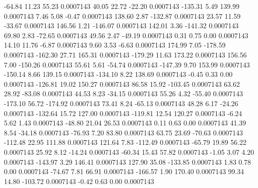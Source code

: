       -64.84       11.23       55.23     0.0007143
       40.05       22.72      -22.20     0.0007143
     -135.31        5.49      139.99     0.0007143
        7.46        5.08       -0.47     0.0007143
      138.60        2.87     -132.87     0.0007143
       23.57       11.59      -33.67     0.0007143
      146.56        1.21     -146.07     0.0007143
      142.01        3.36     -141.32     0.0007143
       69.80        2.83      -72.65     0.0007143
       49.56        2.47      -49.19     0.0007143
        0.31        0.75        0.00     0.0007143
       14.10       11.76       -6.87     0.0007143
        9.60        3.53       -6.63     0.0007143
      174.99        7.05     -178.59     0.0007143
     -162.30       27.71      165.31     0.0007143
     -179.29       11.63      173.22     0.0007143
      156.56        7.00     -150.26     0.0007143
       55.61        5.61      -54.74     0.0007143
     -147.39        9.70      153.99     0.0007143
     -150.14        8.66      139.15     0.0007143
     -134.10        8.22      138.69     0.0007143
       -0.45        0.33        0.00     0.0007143
     -126.81       19.02      150.27     0.0007143
       86.58       15.92     -103.45     0.0007143
       63.62       28.92      -83.08     0.0007143
       44.53        8.23      -34.15     0.0007143
       55.26        4.32      -55.40     0.0007143
     -173.10       56.72     -174.92     0.0007143
       73.41        8.24      -65.13     0.0007143
       48.28        6.17      -24.26     0.0007143
     -132.64       15.72      127.00     0.0007143
     -119.81       12.54      120.27     0.0007143
       -6.24        5.62        1.43     0.0007143
      -48.80       21.04       26.53     0.0007143
        0.11        0.63        0.00     0.0007143
       41.39        8.54      -34.18     0.0007143
      -76.93        7.20       83.80     0.0007143
       63.75       23.69      -70.63     0.0007143
     -112.48       22.95      111.88     0.0007143
      121.64        7.83     -112.49     0.0007143
      -65.79       19.89       56.22     0.0007143
       25.92        8.12      -14.24     0.0007143
      -60.34       15.43       57.82     0.0007143
       -1.05        3.07        4.20     0.0007143
     -143.97        3.29      146.41     0.0007143
      127.90       35.08     -133.85     0.0007143
        1.83        0.78        0.00     0.0007143
      -74.67        7.81       66.91     0.0007143
     -166.57        1.90      170.40     0.0007143
       99.34       14.80     -103.72     0.0007143
       -0.42        0.63        0.00     0.0007143
